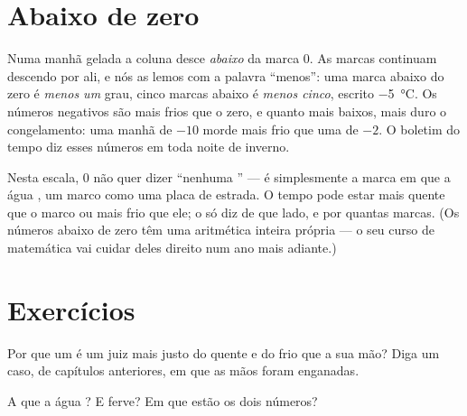 \section{Abaixo de zero}

\begin{example}\label{ex:g3:temperature-thermometers:belowzero}
Numa manhã gelada a coluna desce \emph{abaixo} da marca $0$. As
marcas continuam descendo por ali, e nós as lemos com a palavra
``menos'': uma marca abaixo do zero é \emph{menos um} grau, cinco
marcas abaixo é \emph{menos cinco}, escrito \qty{-5}{\celsius}. Os
números negativos são mais frios que o zero, e quanto mais baixos,
mais duro o congelamento: uma manhã de $-10$ morde mais frio que uma
de $-2$. O boletim do tempo diz esses números em toda noite de
inverno.
\end{example}

\begin{remark}\label{rem:g3:temperature-thermometers:zero}
Nesta escala, $0$ não quer dizer ``nenhuma '' --- é
simplesmente a marca em que a água , um marco como uma placa
de estrada. O tempo pode estar mais quente que o marco ou mais frio
que ele; o  só diz de que lado, e por quantas marcas. (Os
números abaixo de zero têm uma aritmética inteira própria --- o seu
curso de matemática vai cuidar deles direito num ano mais adiante.)
\end{remark}

\section{Exercícios}

\begin{exercise}[$\star$]\label{exo:g3:temperature-thermometers:1}
Por que um  é um juiz mais justo do quente e do frio que a
sua mão? Diga um caso, de capítulos anteriores, em que as mãos foram
enganadas.
\end{exercise}

\begin{exercise}[$\star$]\label{exo:g3:temperature-thermometers:2}
A que  a água ? E ferve? Em que  estão os
dois números?
\end{exercise}

